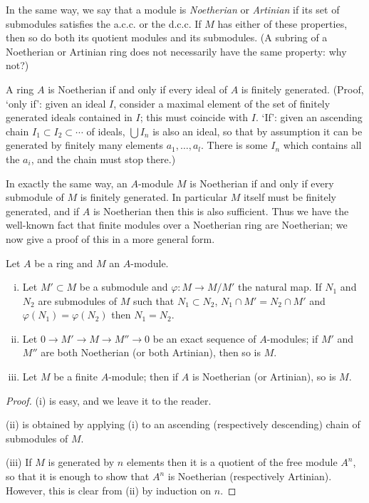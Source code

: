 In the same way, we say that a module is \emph{Noetherian} or \emph{Artinian} if its set of
submodules satisfies the a.c.c. or the d.c.c. If $M$ has either of these properties,
then so do both its quotient modules and its submodules. (A subring of a
Noetherian or Artinian ring does not necessarily have the same property:
why not?)

A ring $A$ is Noetherian if and only if every ideal of $A$ is finitely generated.
(Proof, `only if': given an ideal $I$, consider a maximal element of the set of
finitely generated ideals contained in $I$; this must coincide with $I$. `If': given
an ascending chain $I_1 \subset I_2 \subset \cdots$ of ideals, $\bigcup I_n$ is also an ideal, so that by
assumption it can be generated by finitely many elements $a_1, \ldots, a_l$. There is
some $I_n$ which contains all the $a_i$, and the chain must stop there.)

In exactly the same way, an $A$-module $M$ is Noetherian if and only if
every submodule of $M$ is finitely generated. In particular $M$ itself must be
finitely generated, and if $A$ is Noetherian then this is also sufficient. Thus we
have the well-known fact that finite modules over a Noetherian ring are
Noetherian; we now give a proof of this in a more general form.

\begin{theorem}\label{thm:3.1}
Let $A$ be a ring and $M$ an $A$-module.
\begin{enumerate}[(i)]
  \item Let $M' \subset M$ be a submodule and $\varphi\colon M \to M/M'$ the natural map. If
        $N_1$ and $N_2$ are submodules of $M$ such that $N_1 \subset N_2$, $N_1 \cap M' = N_2 \cap M'$
        and $\varphi(N_1) = \varphi(N_2)$ then $N_1 = N_2$.
  \item Let $0 \to M' \to M \to M'' \to 0$ be an exact sequence of $A$-modules;
        if $M'$ and $M''$ are both Noetherian (or both Artinian), then so is $M$.
  \item Let $M$ be a finite $A$-module; then if $A$ is Noetherian (or Artinian),
        so is $M$.
\end{enumerate}
\end{theorem}

\begin{proof}
(i) is easy, and we leave it to the reader.

(ii) is obtained by applying (i) to an ascending (respectively descending)
chain of submodules of $M$.

(iii) If $M$ is generated by $n$ elements then it is a quotient of the free module
$A^n$, so that it is enough to show that $A^n$ is Noetherian (respectively Artinian).
However, this is clear from (ii) by induction on $n$.
\end{proof}

